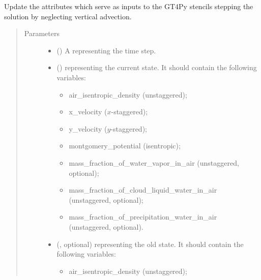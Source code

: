 \documentclass[letterpaper,10pt,english]{sphinxmanual}
\begin{document}
\begin{fulllineitems}
\begin{fulllineitems}
\label{\detokenize{api:tasmania.dycore.prognostic_isentropic_nonconservative_centered.PrognosticIsentropicNonconservativeCentered._stencils_stepping_by_neglecting_vertical_advection_set_inputs}}
Update the attributes which serve as inputs to the GT4Py stencils stepping the solution
by neglecting vertical advection.
\begin{quote}\begin{description}
\item[{Parameters}] \leavevmode\begin{itemize}
\item {} 
 () \textendash{} A  representing the time step.

\item {} 
 () \textendash{} 
{\hyperref[\detokenize{api:tasmania.storages.state_isentropic.StateIsentropic}]{}} representing the current state.
It should contain the following variables:
\begin{itemize}
\item {} 
air\_isentropic\_density (unstaggered);

\item {} 
x\_velocity (\(x\)-staggered);

\item {} 
y\_velocity (\(y\)-staggered);

\item {} 
montgomery\_potential (isentropic);

\item {} 
mass\_fraction\_of\_water\_vapor\_in\_air (unstaggered, optional);

\item {} 
mass\_fraction\_of\_cloud\_liquid\_water\_in\_air (unstaggered, optional);

\item {} 
mass\_fraction\_of\_precipitation\_water\_in\_air (unstaggered, optional).

\end{itemize}


\item {} 
 (, optional) \textendash{} 
{\hyperref[\detokenize{api:tasmania.storages.state_isentropic.StateIsentropic}]{}} representing the old state.
It should contain the following variables:
\begin{itemize}
\item {} 
air\_isentropic\_density (unstaggered);


\end{itemize}
\end{itemize}
\end{description}
\end{quote}
\end{fulllineitems}
\end{fulllineitems}
\end{document}
